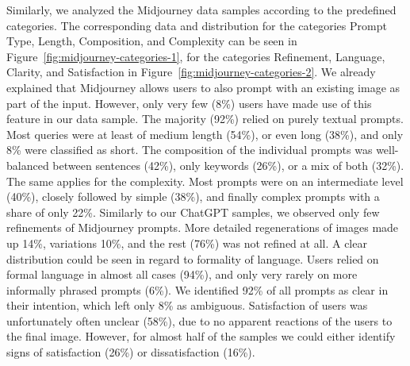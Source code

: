 Similarly, we analyzed the Midjourney data samples according to the predefined categories.
The corresponding data and distribution for the categories Prompt Type, Length, Composition, and
Complexity can be seen in Figure~\ref{fig:midjourney-categories-1}, for the categories Refinement, Language, Clarity, and Satisfaction in Figure~\ref{fig:midjourney-categories-2}.
We already explained that Midjourney allows users to also prompt with an existing image as part of
the input.
However, only very few (8\%) users have made use of this feature in our data sample.
The majority (92\%) relied on purely textual prompts.
Most queries were at least of medium length (54\%), or even long (38\%), and only 8\%
were classified as short.
The composition of the individual prompts was well-balanced between sentences (42\%), only keywords
(26\%), or a mix of both (32\%).
The same applies for the complexity.
Most prompts were on an intermediate level (40\%), closely followed by simple (38\%), and finally
complex prompts with a share of only 22\%.
Similarly to our ChatGPT samples, we observed only few refinements of Midjourney prompts.
More detailed regenerations of images made up 14\%, variations 10\%, and the rest (76\%) was not
refined
at all.
A clear distribution could be seen in regard to formality of language.
Users relied on formal language in almost all cases (94\%), and only very rarely on more informally
phrased prompts (6\%).
We identified 92\% of all prompts as clear in their intention, which left only 8\% as ambiguous.
Satisfaction of users was unfortunately often unclear (58\%), due to no apparent reactions of the
users to the final image.
However, for almost half of the samples we could either identify signs of satisfaction (26\%) or
dissatisfaction (16\%).

